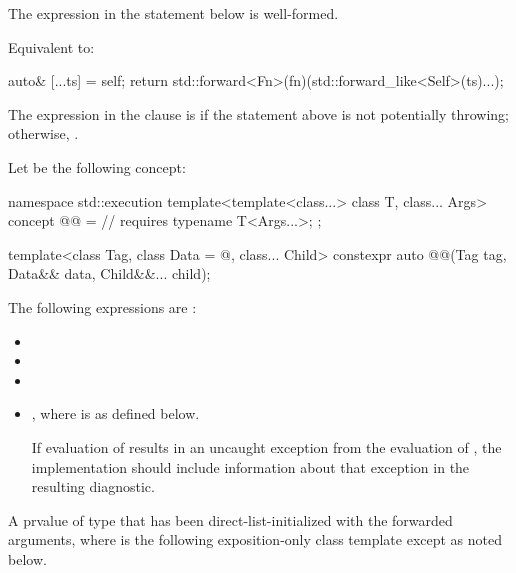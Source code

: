 \begin{itemdescr}
\pnum
\constraints
The expression in the  statement below is well-formed.

\pnum
\effects
Equivalent to:
\begin{codeblock}
auto& [...ts] = self;
return std::forward<Fn>(fn)(std::forward_like<Self>(ts)...);
\end{codeblock}

\pnum
\remarks
The expression in the  clause is 
if the  statement above is not potentially throwing;
otherwise, .
\end{itemdescr}

\pnum
Let  be the following concept:
\begin{codeblock}
namespace std::execution {
  template<template<class...> class T, class... Args>
  concept @@ =                                // \expos
    requires { typename T<Args...>; };
}
\end{codeblock}

\begin{itemdecl}
template<class Tag, class Data = @\seebelow@, class... Child>
  constexpr auto @@(Tag tag, Data&& data, Child&&... child);
\end{itemdecl}

\begin{itemdescr}
\pnum
\mandates
The following expressions are :
\begin{itemize}
\item {}
\item {}
\item {}
\item%
,
where  is 
as defined below.

 \recommended
If evaluation of  results in
an uncaught exception from
the evaluation of ,
the implementation should include information about that exception in
the resulting diagnostic.
\end{itemize}

\pnum
\returns
A prvalue of
type 
that has been direct-list-initialized with the forwarded arguments,
where  is the following exposition-only class template except as noted below.
\end{itemdescr}

